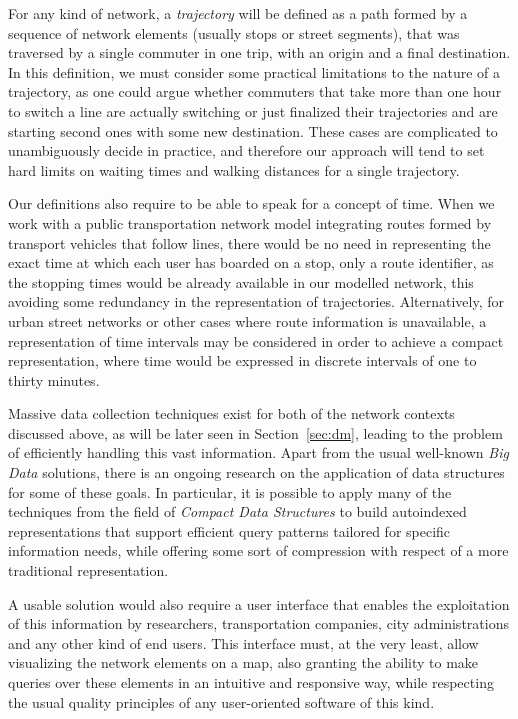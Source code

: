 \documentclass[a4paper,10pt,twoside]{book}
\begin{document}
	For any kind of network, a \textit{trajectory} will be defined as a path formed by a sequence of network elements (usually stops or street segments), that was traversed by a single commuter in one trip, with an origin and a final destination. In this definition, we must consider some practical limitations to the nature of a trajectory, as one could argue whether commuters that take more than one hour to switch a line are actually switching or just finalized their trajectories and are starting second ones with some new destination. These cases are complicated to unambiguously decide in practice, and therefore our approach will tend to set hard limits on waiting times and walking distances for a single trajectory.
	
	Our definitions also require to be able to speak for a concept of time. When we work with a public transportation network model integrating routes formed by transport vehicles that follow lines, there would be no need in representing the exact time at which each user has boarded on a stop, only a route identifier, as the stopping times would be already available in our modelled network, this avoiding some redundancy in the representation of trajectories.
	Alternatively, for urban street networks or other cases where route information is unavailable, a representation of time intervals may be considered in order to achieve a compact representation, where time would be expressed in discrete intervals of one to thirty minutes.
	
	Massive data collection techniques exist for both of the network contexts discussed above, as will be later seen in Section~\ref{sec:dm}, leading to the problem of efficiently handling this vast information. Apart from the usual well-known \textit{Big Data} solutions, there is an ongoing research on the application of data structures for some of these goals. In particular, it is possible to apply many of the techniques from the field of \textit{Compact Data Structures} to build autoindexed representations that support efficient query patterns tailored for specific information needs, while offering some sort of compression with respect of a more traditional representation.
	
	A usable solution would also require a user interface that enables the exploitation of this information by researchers, transportation companies, city administrations and any other kind of end users. This interface must, at the very least, allow visualizing the network elements on a map, also granting the ability to make queries over these elements in an intuitive and responsive way, while respecting the usual quality principles of any user-oriented software of this kind.
	
\end{document}
